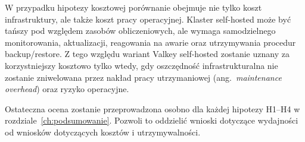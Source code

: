 W przypadku hipotezy kosztowej porównanie obejmuje nie tylko koszt infrastruktury, ale także koszt pracy operacyjnej. Klaster self-hosted może być tańszy pod względem zasobów obliczeniowych, ale wymaga samodzielnego monitorowania, aktualizacji, reagowania na awarie oraz utrzymywania procedur backup/restore. Z tego względu wariant Valkey self-hosted zostanie uznany za korzystniejszy kosztowo tylko wtedy, gdy oszczędność infrastrukturalna nie zostanie zniwelowana przez nakład pracy utrzymaniowej (ang.~\textit{maintenance overhead}) oraz ryzyko operacyjne.

Ostateczna ocena zostanie przeprowadzona osobno dla każdej hipotezy H1--H4 w rozdziale~\ref{ch:podsumowanie}. Pozwoli to oddzielić wnioski dotyczące wydajności od wniosków dotyczących kosztów i utrzymywalności.
